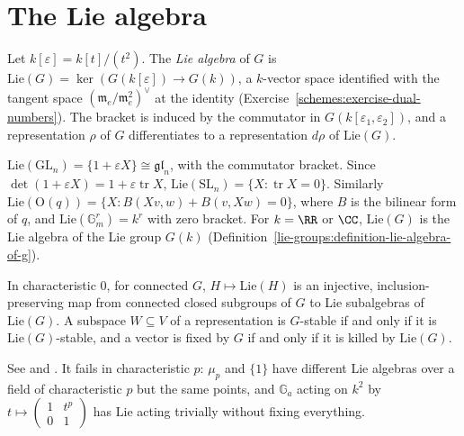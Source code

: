 \section{The Lie algebra}\label{algebraic-groups:section-lie-algebra}

\begin{definition}\label{algebraic-groups:definition-lie-algebra}
Let $k[\varepsilon] = k[t]/(t^2)$. The \emph{Lie algebra} of $G$ is $\mathrm{Lie}(G) = \ker(G(k[\varepsilon]) \to G(k))$, a $k$-vector space identified with the tangent space
$(\mathfrak{m}_e/\mathfrak{m}_e^2)^\vee$ at the identity (Exercise~\ref{schemes:exercise-dual-numbers}). The bracket is induced by the commutator in
$G(k[\varepsilon_1, \varepsilon_2])$, and a representation $\rho$ of $G$ differentiates to a representation $d\rho$ of $\mathrm{Lie}(G)$.
\end{definition}

\begin{example}\label{algebraic-groups:example-lie-algebras}
$\mathrm{Lie}(\mathrm{GL}_n) = \{1 + \varepsilon X\} \cong \mathfrak{gl}_n$, with the commutator bracket. Since $\det(1 + \varepsilon X) = 1 + \varepsilon\operatorname{tr}X$,
$\mathrm{Lie}(\mathrm{SL}_n) = \{X : \operatorname{tr}X = 0\}$. Similarly $\mathrm{Lie}(\mathrm{O}(q)) = \{X : B(Xv, w) + B(v, Xw) = 0\}$, where $B$ is the bilinear form of $q$, and
$\mathrm{Lie}(\mathbb{G}_m^r) = k^r$ with zero bracket. For $k = \RR$ or $\CC$, $\mathrm{Lie}(G)$ is the Lie algebra of the Lie group $G(k)$
(Definition~\ref{lie-groups:definition-lie-algebra-of-g}).
\end{example}

\begin{proposition}\label{algebraic-groups:proposition-lie-correspondence}
In characteristic $0$, for connected $G$, $H \mapsto \mathrm{Lie}(H)$ is an injective, inclusion-preserving map from connected closed subgroups of $G$ to Lie subalgebras of
$\mathrm{Lie}(G)$. A subspace $W \subseteq V$ of a representation is $G$-stable if and only if it is $\mathrm{Lie}(G)$-stable, and a vector is fixed by $G$ if and only if it is
killed by $\mathrm{Lie}(G)$.
\end{proposition}

See \cite{borel-lag} and \cite{milne-algebraic-groups}. It fails in characteristic $p$: $\mu_p$ and $\{1\}$ have
different Lie algebras over a field of characteristic $p$ but the same points, and $\mathbb{G}_a$ acting on $k^2$ by $t \mapsto \left(\begin{smallmatrix}1 & t^p \\ 0 & 1\end{smallmatrix}\right)$
has $\mathrm{Lie}$ acting trivially without fixing everything.

